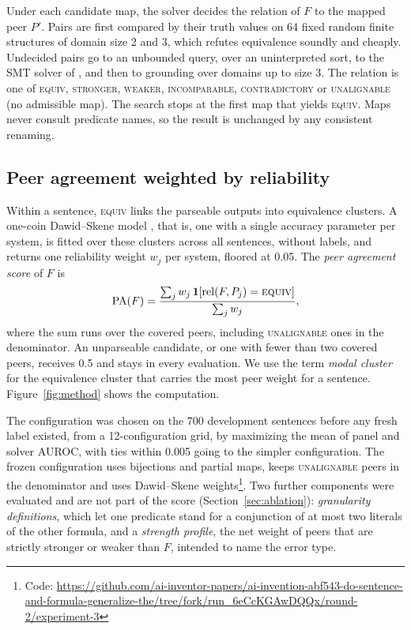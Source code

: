 \documentclass[11pt,letterpaper]{article}
\newcommand{\EQ}{\textsc{equiv}}
\begin{document}
Under each candidate map, the solver decides the relation of $F$ to the mapped peer $P'$. Pairs are first compared by their truth values on 64 fixed random finite structures of domain size 2 and 3, which refutes equivalence soundly and cheaply. Undecided pairs go to an unbounded query, over an uninterpreted sort, to the SMT solver of \citet{Moura2008}, and then to grounding over domains up to size 3. The relation is one of \EQ, \textsc{stronger}, \textsc{weaker}, \textsc{incomparable}, \textsc{contradictory} or \textsc{unalignable} (no admissible map). The search stops at the first map that yields \EQ. Maps never consult predicate names, so the result is unchanged by any consistent renaming.

\subsection{Peer agreement weighted by reliability}

Within a sentence, \EQ{} links the parseable outputs into equivalence clusters. A one-coin Dawid--Skene model \citep{Dawid1979}, that is, one with a single accuracy parameter per system, is fitted over these clusters across all sentences, without labels, and returns one reliability weight $w_j$ per system, floored at 0.05. The \emph{peer agreement score} of $F$ is
\begin{equation}
  \mathrm{PA}(F) = \frac{\sum_{j} w_j \,\mathbf{1}[\mathrm{rel}(F, P_j) = \textsc{equiv}]}{\sum_{j} w_j},
\end{equation}
where the sum runs over the covered peers, including \textsc{unalignable} ones in the denominator. An unparseable candidate, or one with fewer than two covered peers, receives 0.5 and stays in every evaluation. We use the term \emph{modal cluster} for the equivalence cluster that carries the most peer weight for a sentence. Figure~\ref{fig:method} shows the computation.

The configuration was chosen on the 700 development sentences before any fresh label existed, from a 12-configuration grid, by maximizing the mean of panel and solver AUROC, with ties within 0.005 going to the simpler configuration. The frozen configuration uses bijections and partial maps, keeps \textsc{unalignable} peers in the denominator and uses Dawid--Skene weights\footnote{Code: \url{https://github.com/ai-inventor-papers/ai-invention-abf543-do-sentence-and-formula-generalize-the/tree/fork/run_6eCcKGAwDQQx/round-2/experiment-3}}. Two further components were evaluated and are not part of the score (Section~\ref{sec:ablation}): \emph{granularity definitions}, which let one predicate stand for a conjunction of at most two literals of the other formula, and a \emph{strength profile}, the net weight of peers that are strictly stronger or weaker than $F$, intended to name the error type.
\end{document}
